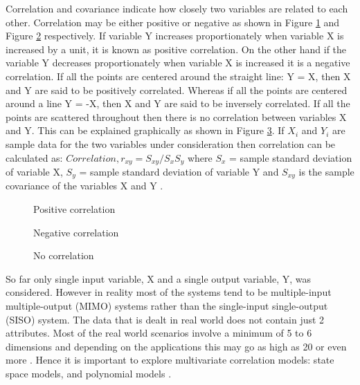 \documentclass[article,type=msc,colorback,12pt,accentcolor=tud8b,table]{tudthesis}
\begin{document}
	Correlation and covariance indicate how closely two variables are related to each other. Correlation may be either positive or negative as shown in Figure \ref{fig:postivie_corr} and Figure \ref{fig:negative_corr} respectively. If variable Y increases proportionately when variable X is increased by a unit, it is known as positive correlation. On the other hand if the variable Y decreases proportionately when variable X is increased it is a negative correlation. If all the points are centered around the straight line: Y = X, then X and Y are said to be positively correlated. Whereas if all the points are centered around a line Y = -X, then X and Y are said to be inversely correlated. If all the points are scattered throughout then there is no correlation between variables X and Y. This can be explained graphically as shown in Figure \ref{fig:no_corr}. If $X_i$ and $Y_i$ are sample data for the two variables under consideration then correlation can be calculated as: $ Correlation, r_{xy} = S_{xy} / S_x S_y $ where $S_x$ = sample standard deviation of variable X, $S_y$ = sample standard deviation of variable Y and $S_{xy}$ is the sample covariance of the variables X and Y \cite{freedman2009statistical}. 

 
 \begin{figure}[H]
 	\begin{center}
 	\end{center}
 	\caption{Positive correlation}
 	\label{fig:postivie_corr}
 \end{figure}
 
 \begin{figure}[H]
 	\begin{center}
 	\end{center}
 	\caption{Negative correlation}
 	\label{fig:negative_corr}
 \end{figure}
 
 \begin{figure}[H]
 	\begin{center}
 	\end{center}
 	\caption{No correlation}
 	\label{fig:no_corr}
 \end{figure}
 

So far only single input variable, X and a single output variable, Y, was considered. However in reality most of the systems tend to be multiple-input multiple-output (MIMO) systems rather than the single-input single-output (SISO) system. The data that is dealt in real world does not contain just 2 attributes. Most of the real world scenarios involve a minimum of 5 to 6 dimensions and depending on the applications this may go as high as 20 or even more \cite{friendly2002corrgrams, li2010judging}. Hence it is important to explore multivariate correlation models: state space models, and polynomial models \cite{ljung1987system, ljung1998system, ljung1999system}.
\end{document}
